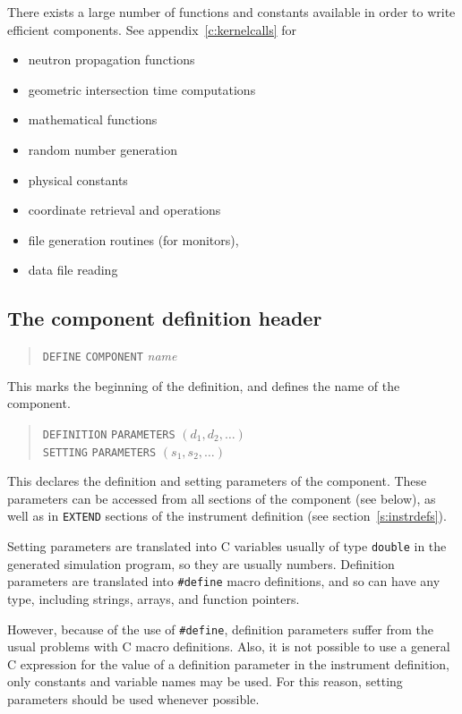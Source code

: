 There exists a large number of functions and constants available in
order to write efficient components. See appendix~\ref{c:kernelcalls}
for
\begin{itemize}
\item neutron propagation functions
\item geometric intersection time computations
\item mathematical functions
\item random number generation
\item physical constants
\item coordinate retrieval and operations
\item file generation routines (for monitors),
\item data file reading
\end{itemize}



\subsection{The component definition header}
\label{s:comp-header}

\begin{quote}
  \texttt{DEFINE} \texttt{COMPONENT} \textit{name}
\end{quote}
This marks the beginning of the definition, and defines the name of the
component.
\begin{quote}
  \texttt{DEFINITION} \texttt{PARAMETERS} $(d_1, d_2, \ldots)$ \\
  \texttt{SETTING} \texttt{PARAMETERS} $(s_1, s_2, \ldots)$
\end{quote}
This declares the definition and setting parameters of the component.
These parameters can be
accessed from all sections of the component (see below),
as well as in \verb+EXTEND+ sections of the instrument definition (see section~\ref{s:instrdefs}).

Setting parameters are translated into C variables usually of type
\verb+double+ in the generated simulation program, so they are usually
numbers. Definition parameters are translated into \verb+#define+ macro
definitions, and so can have any type, including strings, arrays, and
function pointers.

However, because of the use of \verb+#define+, definition parameters
suffer from the usual problems with C macro definitions. Also, it is not
possible to use a general C expression for the value of a definition
parameter in the instrument definition, only constants and variable
names may be used. For this reason, setting parameters should be used
whenever possible.

